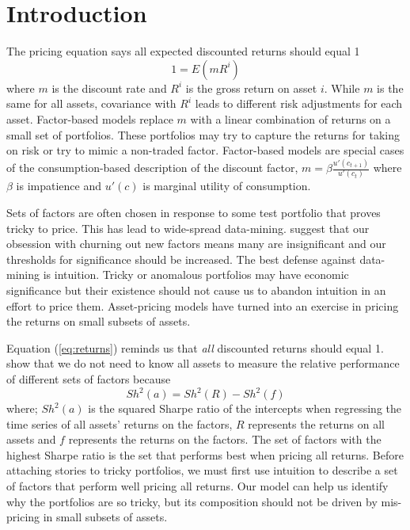 
\section{Introduction}

The pricing equation says all expected discounted returns should equal 1
\begin{equation}
\label{eq:returns}
1=E(mR^i)
\end{equation}
where $m$ is the discount rate and $R^i$ is the gross return on asset $i$.
While $m$ is the same for all assets, covariance with $R^i$ leads to different risk 
adjustments for each asset.
Factor-based models replace $m$ with a linear combination of returns on a small set of 
portfolios. These portfolios may try to capture the returns for 
taking on risk or try to mimic a non-traded factor.
Factor-based models are special cases of the consumption-based description of the discount 
factor, $m=\beta\frac{u'(c_{t+1})}{u'(c_t)}$ where $\beta$ is impatience and $u'(c)$ is 
marginal utility of consumption.

Sets of factors are often chosen in response to some test portfolio that proves tricky to 
price.
This has lead to wide-spread data-mining.
\textcite{harvey2016and} suggest that our obsession with churning out new factors means many 
are insignificant and our thresholds for significance should be increased.
The best defense against data-mining is intuition.
Tricky or anomalous portfolios may have economic significance but their existence should not 
cause us to abandon intuition in an effort to price them.
Asset-pricing models have turned into an exercise in pricing the returns on small subsets of 
assets.

Equation (\ref{eq:returns}) reminds us that \emph{all} discounted returns should equal 1.
\textcite{barillas2016alpha} show that we do not need to know all assets to measure the 
relative performance of different sets of factors because
\begin{equation}
\label{eq:maxsh}
Sh^2(a) = Sh^2(R) - Sh^2(f)
\end{equation}
where; $Sh^2(a)$ is the squared Sharpe ratio of the intercepts when regressing the time series 
of all assets' returns on the factors, $R$ represents the returns on all assets and $f$ 
represents the returns on the factors.
The set of factors with the highest Sharpe ratio is the set that performs best when pricing 
all returns.
Before attaching stories to tricky portfolios, we must first use intuition to describe a set 
of factors that perform well pricing all returns.
Our model can help us identify why the portfolios are so tricky, but its composition should 
not be driven by mis-pricing in small subsets of assets.


